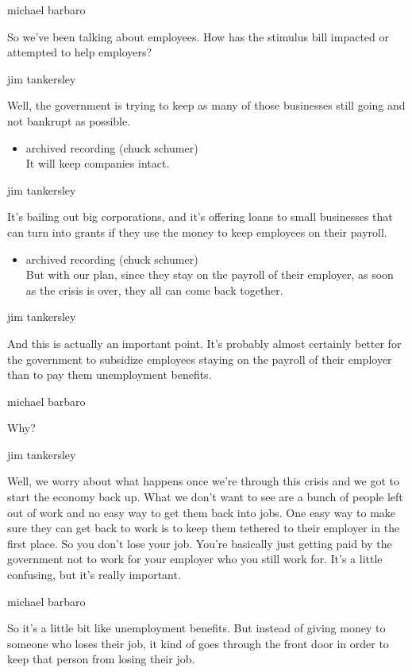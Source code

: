 michael barbaro

So we've been talking about employees. How has the stimulus bill
impacted or attempted to help employers?

jim tankersley

Well, the government is trying to keep as many of those businesses still
going and not bankrupt as possible.

\begin{itemize}
\tightlist
\item
  archived recording (chuck schumer)\\
  It will keep companies intact.
\end{itemize}

jim tankersley

It's bailing out big corporations, and it's offering loans to small
businesses that can turn into grants if they use the money to keep
employees on their payroll.

\begin{itemize}
\tightlist
\item
  archived recording (chuck schumer)\\
  But with our plan, since they stay on the payroll of their employer,
  as soon as the crisis is over, they all can come back together.
\end{itemize}

jim tankersley

And this is actually an important point. It's probably almost certainly
better for the government to subsidize employees staying on the payroll
of their employer than to pay them unemployment benefits.

michael barbaro

Why?

jim tankersley

Well, we worry about what happens once we're through this crisis and we
got to start the economy back up. What we don't want to see are a bunch
of people left out of work and no easy way to get them back into jobs.
One easy way to make sure they can get back to work is to keep them
tethered to their employer in the first place. So you don't lose your
job. You're basically just getting paid by the government not to work
for your employer who you still work for. It's a little confusing, but
it's really important.

michael barbaro

So it's a little bit like unemployment benefits. But instead of giving
money to someone who loses their job, it kind of goes through the front
door in order to keep that person from losing their job.

